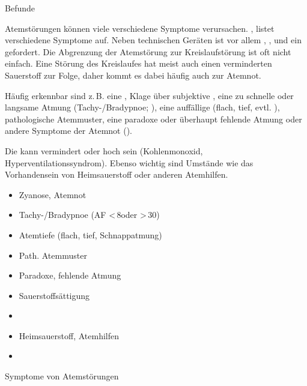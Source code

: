 \clearpage%

\TextSlide
{{\eye} Befunde}
{Atemstörungen können viele verschiedene Symptome
verursachen. , listet
verschiedene Symptome auf. Neben technischen Geräten ist vor
allem ,
,  und ein 
gefordert.
Die Abgrenzung der Atemstörung zur Kreislaufstörung ist oft
nicht einfach. Eine Störung des Kreislaufes hat meist auch
einen verminderten Sauerstoff zur Folge, daher
kommt es dabei häufig {auch} zur Atemnot.

Häufig erkennbar sind z.\,B. eine , 
Klage über subjektive , 
eine zu schnelle
oder langsame Atmung (Tachy-/Bradypnoe; 
), 
eine auffällige  (flach, tief, evtl. 
), 
pathologische Atemmuster, 
eine paradoxe oder überhaupt fehlende Atmung oder 
andere Symptome der Atemnot
().

Die  kann vermindert 
oder hoch sein (Kohlenmonoxid, Hyperventilationssyndrom). 
Ebenso wichtig sind Umstände wie das Vorhandensein 
von Heimsauerstoff
oder anderen Atemhilfen.
}
{\begin{itemize}
  \item Zyanose, Atemnot
  \item Tachy-/Bradypnoe (AF <\,8\PerMin* oder >\,30\PerMin*)
  \item Atemtiefe (flach, tief, Schnappatmung)
  \item Path. Atemmuster
  \item Paradoxe, fehlende Atmung
  \item Sauerstoffsättigung
  \item {}
  \item Heimsauerstoff, Atemhilfen
  \item {}
\end{itemize}
}
{}
{}
{}



\TableWide
{Symptome von Atemstörungen}%
{}%
{\label{tab:atmung-symptome}}%
{}%
{}%
{}%
{}%


\clearpage %


